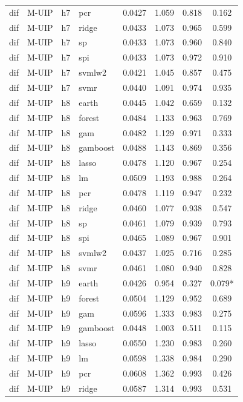 \begin{ThreePartTable}
\begin{longtable}[t]{llclcccc}
dif & M-UIP & h7 & pcr & 0.0427 & 1.059 & 0.818 & 0.162\\
dif & M-UIP & h7 & ridge & 0.0433 & 1.073 & 0.965 & 0.599\\
dif & M-UIP & h7 & sp & 0.0433 & 1.073 & 0.960 & 0.840\\
dif & M-UIP & h7 & spi & 0.0433 & 1.073 & 0.972 & 0.910\\
dif & M-UIP & h7 & svmlw2 & 0.0421 & 1.045 & 0.857 & 0.475\\
dif & M-UIP & h7 & svmr & 0.0440 & 1.091 & 0.974 & 0.935\\
\addlinespace
dif & M-UIP & h8 & earth & 0.0445 & 1.042 & 0.659 & 0.132\\
dif & M-UIP & h8 & forest & 0.0484 & 1.133 & 0.963 & 0.769\\
dif & M-UIP & h8 & gam & 0.0482 & 1.129 & 0.971 & 0.333\\
dif & M-UIP & h8 & gamboost & 0.0488 & 1.143 & 0.869 & 0.356\\
dif & M-UIP & h8 & lasso & 0.0478 & 1.120 & 0.967 & 0.254\\
dif & M-UIP & h8 & lm & 0.0509 & 1.193 & 0.988 & 0.264\\
dif & M-UIP & h8 & pcr & 0.0478 & 1.119 & 0.947 & 0.232\\
dif & M-UIP & h8 & ridge & 0.0460 & 1.077 & 0.938 & 0.547\\
dif & M-UIP & h8 & sp & 0.0461 & 1.079 & 0.939 & 0.793\\
dif & M-UIP & h8 & spi & 0.0465 & 1.089 & 0.967 & 0.901\\
dif & M-UIP & h8 & svmlw2 & 0.0437 & 1.025 & 0.716 & 0.285\\
dif & M-UIP & h8 & svmr & 0.0461 & 1.080 & 0.940 & 0.828\\
\addlinespace
dif & M-UIP & h9 & earth & 0.0426 & 0.954 & 0.327 & 0.079*\\
dif & M-UIP & h9 & forest & 0.0504 & 1.129 & 0.952 & 0.689\\
dif & M-UIP & h9 & gam & 0.0596 & 1.333 & 0.983 & 0.275\\
dif & M-UIP & h9 & gamboost & 0.0448 & 1.003 & 0.511 & 0.115\\
dif & M-UIP & h9 & lasso & 0.0550 & 1.230 & 0.983 & 0.260\\
dif & M-UIP & h9 & lm & 0.0598 & 1.338 & 0.984 & 0.290\\
dif & M-UIP & h9 & pcr & 0.0608 & 1.362 & 0.993 & 0.426\\
dif & M-UIP & h9 & ridge & 0.0587 & 1.314 & 0.993 & 0.531\\

\end{longtable}
\end{ThreePartTable}
